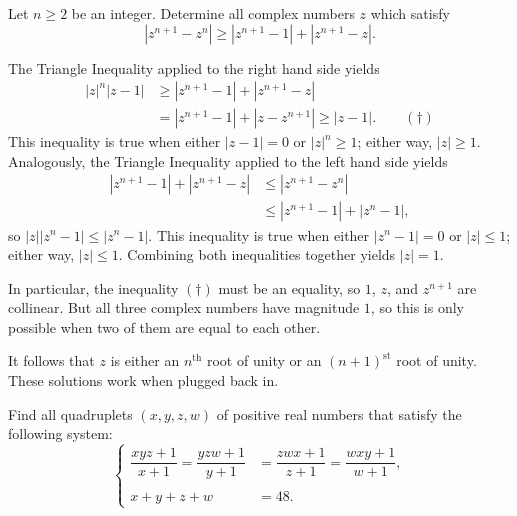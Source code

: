 %	



\begin{question}[name={2023 Romanian District Olympiad, \href{https://artofproblemsolving.com/community/c6h3029964p27258241}{Problem 10.3}}]
	Let $n\geqslant 2$ be an integer. Determine all complex numbers $z{}$ which satisfy\[|z^{n+1}-z^n|\geqslant|z^{n+1}-1|+|z^{n+1}-z|.\]
\end{question}

\begin{solution}[name={Solution by David Altizio}]
	The Triangle Inequality applied to the right hand side yields
	\begin{align*}
		|z|^n|z-1| &\geqslant |z^{n+1} - 1| + |z^{n+1} - z| \\
		&= |z^{n+1} - 1| + |z - z^{n+1}| \geqslant |z - 1|.\qquad(\dagger)
	\end{align*}This inequality is true when either $|z - 1| = 0$ or $|z|^n \geqslant 1$; either way, $|z| \geqslant 1$. Analogously, the Triangle Inequality applied to the left hand side yields
	\begin{align*}
		|z^{n+1} - 1| + |z^{n+1} - z| &\leqslant |z^{n+1} - z^n| \\
		&\leqslant |z^{n+1} - 1| + |z^n - 1|,
	\end{align*}so $|z| |z^n - 1| \leqslant |z^n - 1|$. This inequality is true when either $|z^n - 1| = 0$ or $|z| \leqslant 1$; either way, $|z| \leqslant 1$. Combining both inequalities together yields $|z| = 1$.
	
	In particular, the inequality $(\dagger)$ must be an equality, so $1$, $z$, and $z^{n+1}$ are collinear. But all three complex numbers have magnitude $1$, so this is only possible when two of them are equal to each other.
	
	It follows that $z$ is either an $n^{\text{th}}$ root of unity or an $(n+1)^{\text{st}}$ root of unity. These solutions work when plugged back in.
\end{solution}


\begin{question}[name={2023 Greece National Olympiad, \href{https://artofproblemsolving.com/community/c6h3017817p27118997}{Problem 1}}]
	Find all quadruplets $(x, y, z, w)$ of positive real numbers that satisfy the following system:
	$$\begin{cases}
		\dfrac{xyz+1}{x+1}= \dfrac{yzw+1}{y+1} &= \dfrac{zwx+1}{z+1}= \dfrac{wxy+1}{w+1},\\
		&\\
		x+y+z+w &= 48.
	\end{cases}$$
\end{question}



